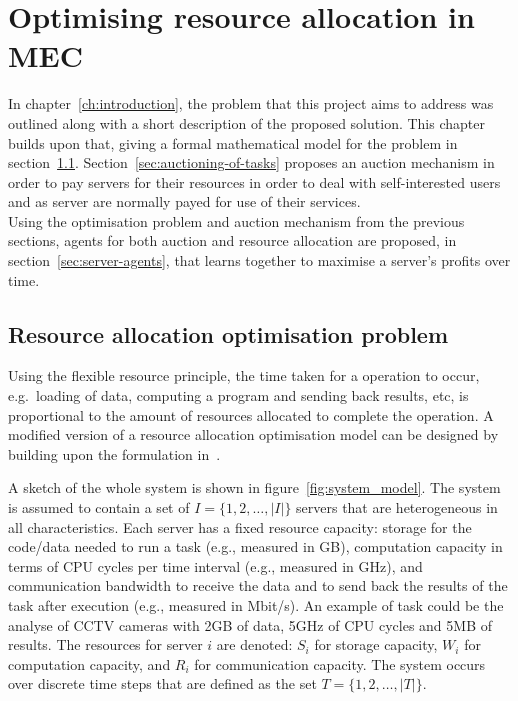 

\chapter{Optimising resource allocation in MEC}
\label{ch:optimising-resource-allocation-in-mec}
In chapter~\ref{ch:introduction}, the problem that this project aims to address was outlined along with a short
description of the proposed solution. This chapter builds upon that, giving a formal mathematical model for the problem
in section~\ref{sec:optimisation-problem}. Section~\ref{sec:auctioning-of-tasks} proposes an auction mechanism in order
to pay servers for their resources in order to deal with self-interested users and as server are normally payed for
use of their services. \\
Using the optimisation problem and auction mechanism from the previous sections, agents for both auction and resource
allocation are proposed, in section~\ref{sec:server-agents}, that learns together to maximise a server's profits
over time.

\section{Resource allocation optimisation problem}
\label{sec:optimisation-problem}
Using the flexible resource principle, the time taken for a operation to occur, e.g.\ loading of data, computing
a program and sending back results, etc, is proportional to the amount of resources allocated to complete the operation.
A modified version of a resource allocation optimisation model can be designed by building upon the formulation
in~\cite{FlexibleResourceAllocation}.

A sketch of the whole system is shown in figure~\ref{fig:system_model}.
The system is assumed to contain a set of $I = \{1,2,\ldots,\left|I\right|\}$ servers that are heterogeneous in all
characteristics. Each server has a fixed resource capacity: storage for the code/data needed to run a task
(e.g., measured in GB), computation capacity in terms of CPU cycles per time interval (e.g., measured in GHz),
and communication bandwidth to receive the data and to send back the results of the task after execution
(e.g., measured in Mbit/s). An example of task could be the analyse of CCTV cameras with 2GB of data, 5GHz of CPU
cycles and 5MB of results. The resources for server $i$ are denoted: $S_i$ for storage capacity, $W_i$ for computation
capacity, and $R_i$ for communication capacity. The system occurs over discrete time steps that are defined as the set
$T = \{1,2,\ldots,\left|T\right|\}$.

